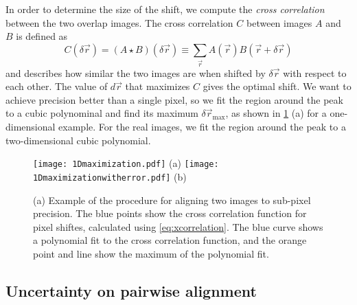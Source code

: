 \documentclass{article}
\begin{document}
In order to determine the size of the shift, we compute the \emph{cross correlation} between the two overlap images.  The cross correlation $C$ between images $A$ and $B$ is defined as
\begin{equation}
C(\delta\vec{r})=(A\star B)(\delta\vec{r})\equiv\sum_{\vec{r}} {A(\vec{r})B(\vec{r}+\delta\vec{r})}
\label{eq:xcorrelation}
\end{equation}
and describes how similar the two images are when shifted by $\delta\vec{r}$ with respect to each other.  The value of $d\vec{r}$ that maximizes $C$ gives the optimal shift.  We want to achieve precision better than a single pixel, so we fit the region around the peak to a cubic polynominal and find its maximum $\delta\vec{r}_\text{max}$, as shown in \cref{fig:1Dmaximization} (a) for a one-dimensional example.  For the real images, we fit the region around the peak to a two-dimensional cubic polynomial.

\begin{figure}[ht]
	\centering
	\begin{multicols}{2}
	\texttt{[image: 1Dmaximization.pdf]} (a)
	\texttt{[image: 1Dmaximizationwitherror.pdf]} (b)
	\end{multicols}
	\caption{(a) Example of the procedure for aligning two images to sub-pixel precision.  The blue points show the cross correlation function for pixel shiftes, calculated using \cref{eq:xcorrelation}.  The blue curve shows a polynomial fit to the cross correlation function, and the orange point and line show the maximum of the polynomial fit.}
	\label{fig:1Dmaximization}
\end{figure}

\subsection{Uncertainty on pairwise alignment}
\end{document}
